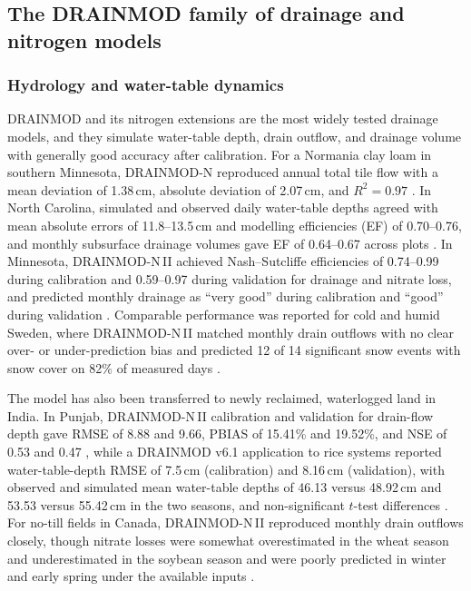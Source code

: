 \documentclass[11pt]{article}
\begin{document}
\subsection{The DRAINMOD family of drainage and nitrogen models}

\subsubsection{Hydrology and water-table dynamics}

DRAINMOD and its nitrogen extensions are the most widely tested drainage models, and they simulate water-table depth, drain outflow, and drainage volume with generally good accuracy after calibration. For a Normania clay loam in southern Minnesota, DRAINMOD-N reproduced annual total tile flow with a mean deviation of 1.38\,cm, absolute deviation of 2.07\,cm, and $R^2 = 0.97$ \parencite{Zhao2000}. In North Carolina, simulated and observed daily water-table depths agreed with mean absolute errors of 11.8--13.5\,cm and modelling efficiencies (EF) of 0.70--0.76, and monthly subsurface drainage volumes gave EF of 0.64--0.67 across plots \parencite{Youssef2006}. In Minnesota, DRAINMOD-N\,II achieved Nash--Sutcliffe efficiencies of 0.74--0.99 during calibration and 0.59--0.97 during validation for drainage and nitrate loss, and predicted monthly drainage as ``very good'' during calibration and ``good'' during validation \parencite{Luo2010,Ale2013}. Comparable performance was reported for cold and humid Sweden, where DRAINMOD-N\,II matched monthly drain outflows with no clear over- or under-prediction bias and predicted 12 of 14 significant snow events with snow cover on 82\% of measured days \parencite{Salazar2009}.

The model has also been transferred to newly reclaimed, waterlogged land in India. In Punjab, DRAINMOD-N\,II calibration and validation for drain-flow depth gave RMSE of 8.88 and 9.66, PBIAS of 15.41\% and 19.52\%, and NSE of 0.53 and 0.47 \parencite{Dar2022}, while a DRAINMOD v6.1 application to rice systems reported water-table-depth RMSE of 7.5\,cm (calibration) and 8.16\,cm (validation), with observed and simulated mean water-table depths of 46.13 versus 48.92\,cm and 53.53 versus 55.42\,cm in the two seasons, and non-significant $t$-test differences \parencite{Dar2025}. For no-till fields in Canada, DRAINMOD-N\,II reproduced monthly drain outflows closely, though nitrate losses were somewhat overestimated in the wheat season and underestimated in the soybean season and were poorly predicted in winter and early spring under the available inputs \parencite{Garmdareh2018}.
\end{document}
